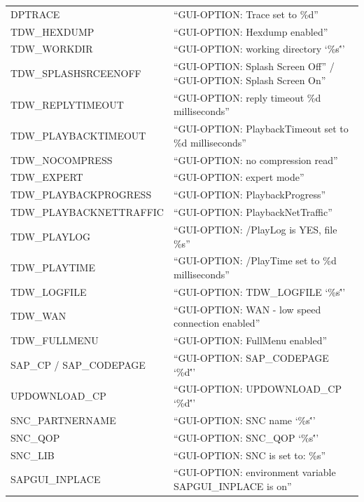 \begin{center}
\begin{tabular}{ | l | l | }
\hline                        
DPTRACE                  & ``GUI-OPTION: Trace set to \%d'' \\
TDW\_HEXDUMP             & ``GUI-OPTION: Hexdump enabled'' \\
TDW\_WORKDIR             & ``GUI-OPTION: working directory `\%s\''' \\
TDW\_SPLASHSRCEENOFF     & ``GUI-OPTION: Splash Screen Off'' / ``GUI-OPTION: Splash Screen On'' \\
TDW\_REPLYTIMEOUT        & ``GUI-OPTION: reply timeout \%d milliseconds'' \\
TDW\_PLAYBACKTIMEOUT     & ``GUI-OPTION: PlaybackTimeout  set to \%d milliseconds'' \\ 
TDW\_NOCOMPRESS          & ``GUI-OPTION: no compression read'' \\
TDW\_EXPERT              & ``GUI-OPTION: expert mode'' \\
TDW\_PLAYBACKPROGRESS    & ``GUI-OPTION: PlaybackProgress'' \\
TDW\_PLAYBACKNETTRAFFIC  & ``GUI-OPTION: PlaybackNetTraffic'' \\
TDW\_PLAYLOG             & ``GUI-OPTION: /PlayLog is YES, file \%s'' \\
TDW\_PLAYTIME            & ``GUI-OPTION: /PlayTime set to \%d milliseconds'' \\
TDW\_LOGFILE             & ``GUI-OPTION: TDW\_LOGFILE `\%s\''' \\
TDW\_WAN                 & ``GUI-OPTION: WAN - low speed connection enabled'' \\
TDW\_FULLMENU            & ``GUI-OPTION: FullMenu enabled'' \\
SAP\_CP / SAP\_CODEPAGE  & ``GUI-OPTION: SAP\_CODEPAGE `\%d\''' \\
UPDOWNLOAD\_CP           & ``GUI-OPTION: UPDOWNLOAD\_CP `\%d\''' \\
SNC\_PARTNERNAME         & ``GUI-OPTION: SNC name `\%s\''' \\
SNC\_QOP                 & ``GUI-OPTION: SNC\_QOP `\%s\''' \\
SNC\_LIB                 & ``GUI-OPTION: SNC is set to: \%s'' \\ 
SAPGUI\_INPLACE          & ``GUI-OPTION: environment variable SAPGUI\_INPLACE is on'' \\
\hline  
\end{tabular}
\end{center}

